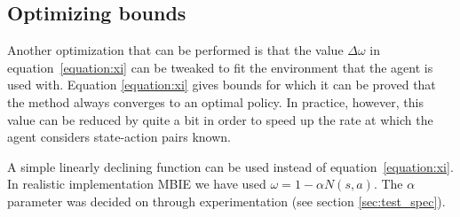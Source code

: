 \subsection{Optimizing bounds}

Another optimization that can be performed is that the value $\Delta \omega$ in
equation~\eqref{equation:xi} can be tweaked to fit the environment that the agent
is used with. Equation \ref{equation:xi} gives bounds for which it can be
proved that the method always converges to an optimal policy. In practice,
however, this value can be reduced by quite a bit in order to speed up the rate
at which the agent considers state-action pairs known. 

A simple linearly declining function can be used instead of
equation~\eqref{equation:xi}. In realistic implementation MBIE we have
used $\omega = 1 - \alpha N(s,a).$ The $\alpha$ parameter was decided on
through experimentation (see section \ref{sec:test_spec}).
